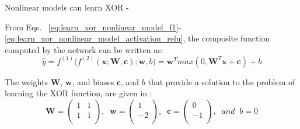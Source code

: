 \begin{frame}[t,allowframebreaks]{Nonlinear models can learn XOR -}
    \framebreak

    From Eqs.~
    \ref{eq:learn_xor_nonlinear_model_f1}-\ref{eq:learn_xor_nonlinear_model_activation_relu},
    the composite function computed by the network
    can be written as:
    \begin{equation}
        \hat{y} = 
        f^{(1)}\Big(f^{(2)}(\mathbf{x};\mathbf{W},\mathbf{c});\mathbf{w},b\Big) =
        \mathbf{w}^{T} max(0, \mathbf{W}^{T} \mathbf{x} + \mathbf{c}) + b 
        \label{eq:learn_xor_nonlinear_model_final}
    \end{equation}        

    The weights $\mathbf{W}$, $\mathbf{w}$, and biases $\mathbf{c}$, and $b$
    that provide a solution to the problem of learning the XOR function, are 
    given in \cite{Goodfellow:2017MITDL}:
    \begin{equation}    
        \mathbf{W} = 
        \begin{pmatrix}
            1 & 1 \\
            1 & 1 \\
        \end{pmatrix}, 
        \;\; 
        \mathbf{w} = 
        \begin{pmatrix}
            1  \\
            -2 \\
        \end{pmatrix}, 
        \;\;
        \mathbf{c} = 
        \begin{pmatrix}
            0 \\
            -1 \\
        \end{pmatrix},         
        \;\;         
        and \;\; b = 0
        \label{eq:learn_xor_nonlinear_model_weights}
    \end{equation}


\end{frame}
